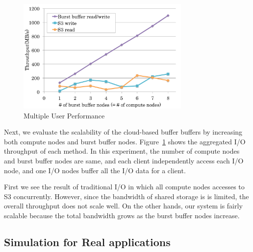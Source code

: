 \begin{figure}
\centering
\includegraphics[width=8.5cm]{img/multiple_client-2.pdf}
\caption{Multiple User Performance}
\label{evaluation:multiple user performance}
\end{figure}
Next, we evaluate the scalability of the
cloud-based buffer buffers by increasing both compute nodes and burst
buffer nodes.
Figure~\ref{evaluation:multiple user performance} shows the aggregated
I/O throughput of each method. In this experiment, the number of compute nodes
and burst buffer nodes are same, and each client independently
access each I/O node, and one I/O nodes buffer all the I/O data for a client.

First we see the result of traditional I/O in which all compute nodes
accesses to S3 concurrently.
However, since the bandwidth of shared storage is is limited, the overall
throughput does not scale well. On the other hands, our system is fairly
scalable because the total bandwidth grows as the burst buffer nodes increase.

\subsection{Simulation for Real applications}


